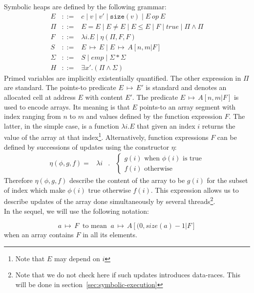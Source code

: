 \documentclass[a4paper,11pt]{llncs}
\newcommand{\size}{\texttt{size}\xspace}
\newcommand{\psto}{{\,{\mapsto}\,}}
\newcounter{note_number}
\begin{document}
\noindent
Symbolic heaps are defined by the following grammar:
\[
\begin{array}{lcl}
	E & ::= & c \mid v \mid v' \mid \size(v) \mid E \ op \ E \\
	\Pi & ::= & E = E \mid E \neq E \mid E \leq E \mid F \mid true \mid \Pi \wedge \Pi \\
	F & ::= & \lambda i . E \mid \eta(\Pi, F, F) \\
	S & ::= & E \psto E \mid E \psto A[n, m | F] \\
	\Sigma & ::= & S \mid emp \mid \Sigma * \Sigma \\
	H & ::= & \exists x' .(\Pi \wedge \Sigma)
\end{array}
\]
Primed variables are implicitly existentially quantified.
The other expression in $\Pi$ are standard.
The points-to predicate $E \psto E'$ is  standard and denotes an allocated cell at address $E$ with content $E'$.
The predicate $E \psto A[n, m | F]$ is used to encode arrays. Its  meaning is  that $E$ points-to an array segment with index ranging from $n$ to $m$ and values defined by the function expression $F$. 
The latter, in the simple case, is a function $\lambda i.E$ that given an index $i$ returns the value of the array at that index\footnote{Note that $E$ may depend on $i$}.
Alternatively, function expressions $F$ can be defined by successions of updates using the constructor $\eta$:
\[
 	\begin{array}{lcll}
	\eta(\phi, g, f) = & \lambda i & . &
		\left\{
			\begin{array}{l}
					g(i) \text{ when $\phi(i)$ is true}\\
					f(i) \text{ otherwise}
			\end{array}
		\right.
	\end{array}
\]
Therefore $\eta(\phi,g,f)$ describe the content of the array to be $g(i)$ for the subset of index which make $\phi(i)$ true otherwise $f(i)$.
This expression allows us to describe updates of the array done simultaneously by several threads\footnote{Note that we do not check here if such updates introduces data-races. This will be done in section~\ref{sec:symbolic-execution}}.\\

\noindent
In the sequel, we will use the following notation:

$$a \psto F ~\text{ to mean }~ a \psto A[(0, size(a) - 1 | F]$$
when an array contains $F$ in all its elements.
\end{document}
